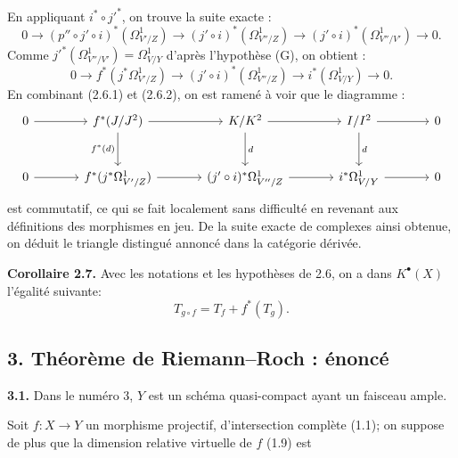 En
appliquant $i^*\circ j'^*$, on trouve la suite exacte :
\[
0\longrightarrow (p''\circ j'\circ i)^*(\Omega^1_{V'/Z})\longrightarrow (j'\circ i)^*(\Omega^1_{V''/Z})\longrightarrow (j'\circ i)^*(\Omega^1_{V''/V'})\longrightarrow0.
\]
Comme $j'^*(\Omega^1_{V''/V'})=\Omega^1_{V/Y}$ d'après l'hypothèse (G), on obtient :
\begin{equation}\tag{2.6.2}
0\longrightarrow f^*(j^*\Omega^1_{V'/Z})\longrightarrow (j'\circ i)^*(\Omega^1_{V''/Z})\longrightarrow i^*(\Omega^1_{V/Y})\longrightarrow0.
\end{equation}
En combinant (2.6.1) et (2.6.2), on est ramené à voir que le diagramme :
\[
\begin{tikzcd}[column sep=large,row sep=large]
0 \arrow[r] & f^*(J/J^2) \arrow[r] \arrow[d,"f^*(d)"'] & K/K^2 \arrow[r] \arrow[d,"d"] & I/I^2 \arrow[r] \arrow[d,"d"] & 0\\
0 \arrow[r] & f^*(j^*\Omega^1_{V'/Z}) \arrow[r] & (j'\circ i)^*\Omega^1_{V''/Z} \arrow[r] & i^*\Omega^1_{V/Y} \arrow[r] & 0
\end{tikzcd}
\]
est commutatif, ce qui se fait localement sans difficulté en revenant aux définitions des morphismes en jeu. De la suite exacte de complexes ainsi obtenue, on déduit le triangle distingué annoncé dans la catégorie dérivée.

\textbf{Corollaire 2.7.} Avec les notations et les hypothèses de 2.6, on a dans $K^{\bullet}(X)$ l'égalité suivante:
\[
T_{g\circ f}=T_f+f^*(T_g).
\]

\subsection*{3. Théorème de Riemann--Roch : énoncé}

\textbf{3.1.} Dans le numéro 3, $Y$ est un schéma quasi-compact ayant un faisceau ample.

Soit $f:X\to Y$ un morphisme projectif, d'intersection complète (1.1); on suppose de plus que la dimension relative virtuelle de $f$ (1.9) est
